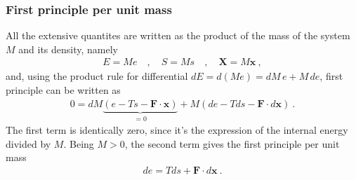 \documentclass[letterpaper,10pt,english]{jupyterBook}
\begin{document}
\subsubsection{First principle per unit mass}
\label{\detokenize{ch/potentials:first-principle-per-unit-mass}}
\sphinxAtStartPar
All the extensive quantites are written as the product of the mass of the system \(M\) and its density, namely
\begin{equation*}
\begin{split}E = M  e \quad , \quad S = M  s \quad , \quad \mathbf{X} = M \mathbf{x} \ ,\end{split}
\end{equation*}
\sphinxAtStartPar
and, using the product rule for differential \(d E = d (M e) = dM \, e + M \, de\), first principle can be written as
\begin{equation*}
\begin{split}0 = d M \underbrace{\left( e - T s - \mathbf{F} \cdot \mathbf{x} \right)}_{= 0} + M \left( d e - T ds - \mathbf{F} \cdot d \mathbf{x} \right) \ .\end{split}
\end{equation*}
\sphinxAtStartPar
The first term is identically zero, since it’s the expression of the internal energy divided by \(M\). Being \(M > 0\), the second term gives the first principle per unit mass
\begin{equation*}
\begin{split}d e = T ds + \mathbf{F} \cdot d \mathbf{x} \ .\end{split}
\end{equation*}
\end{document}
